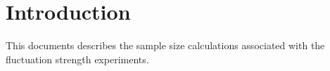 \documentclass[a4paper]{article}
\begin{document}

\section{Introduction} %
\label{sec:introduction}

This documents describes the sample size calculations associated with the
fluctuation strength experiments.

\end{document}
